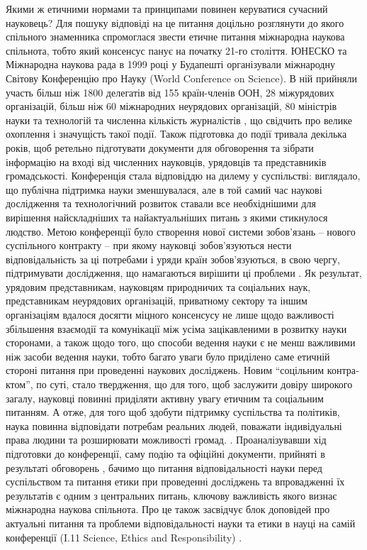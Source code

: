 Якими ж етичними нормами та принципами повинен керуватися сучасний науковець? Для пошуку відповіді на це питання доцільно розглянути до якого спільного знаменника спромоглася звести етичне питання міжнародна наукова спільнота, тобто який консенсус панує на початку 21-го століття. ЮНЕСКО та Міжнародна наукова рада в 1999 році у Будапешті організували міжнародну Світову Конференцію про Науку (World Conference on Science). В ній прийняли участь більш ніж 1800 делегатів від 155 країн-членів ООН, 28 міжурядових організацій, більш ніж 60 міжнародних неурядових організацій, 80 міністрів науки та технологій та численна кількість журналістів \cite[7]{WorldConferenceOnScience}, що свідчить про велике охоплення і значущість такої події. Також підготовка до події тривала декілька років, щоб ретельно підготувати документи для обговорення та зібрати інформацію на вході від численних науковців, урядовців та представників громадськості. Конференція стала відповіддю на дилему у суспільстві: виглядало, що публічна підтримка науки зменшувалася, але в той самий час наукові дослідження та технологічний розвиток ставали все необхіднішими для вирішення найскладніших та найактуальніших питань з якими стикнулося людство. Метою конференції було створення нової системи зобов'язань -- нового суспільного контракту -- при якому науковці зобов'язуються нести відповідальність за ці потребами і уряди країн зобов'язуються, в свою чергу, підтримувати дослідження, що намагаються вирішити ці проблеми \cite[5]{WorldConferenceOnScience}. Як результат, урядовим представникам, науковцям природничих та соціальних наук, представникам неурядових організацій, приватному сектору та іншим організаціям вдалося досягти міцного консенсусу не лише щодо важливості збільшення взаємодії та комунікації між усіма зацікавленими в розвитку науки сторонами, а також щодо того, що способи ведення науки є не менш важливими ніж засоби ведення науки, тобто багато уваги було приділено саме етичній стороні питання при проведенні наукових досліджень. Новим \foreignquote{ukrainian}{соцільним контрактом}, по суті, стало твердження, що для того, щоб заслужити довіру широкого загалу, науковці повинні приділяти активну увагу етичним та соціальним питанням. А отже, для того щоб здобути підтримку суспільства та політиків, наука повинна відповідати потребам реальних людей, поважати індивідуальні права людини та розширювати можливості громад. \cite{doi:10.1126/science.285.5427.529}. Проаналізувавши хід підготовки до конференції, саму подію та офіційні документи, прийняті в результаті обговорень \cite[461]{WorldConferenceOnScience}, бачимо що питання відповідальності науки перед суспільством та питання етики при проведенні досліджень та впровадженні їх результатів є одним з центральних питань, ключову важливість якого визнає міжнародна наукова спільнота. Про це також засвідчує блок доповідей про актуальні питання та проблеми відповідальності науки та етики в науці на самій конференції (I.11 Science, Ethics and Responsibility) \cite[206]{WorldConferenceOnScience}.

